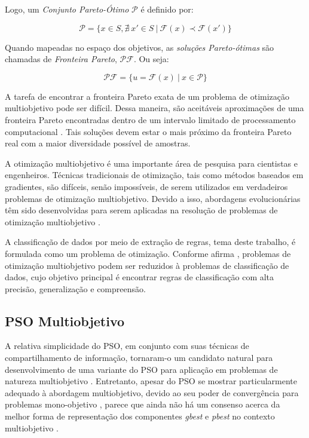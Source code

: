 \documentclass[
	12pt,				%
	openany,			%
	oneside,	
	a4paper,			%
	brazil,				%
	]{unimontes-ppgmsc-abntex2}
\begin{document}
Logo, um {\em Conjunto Pareto-Ótimo} $\mathcal{P}$ é definido por:

\begin{equation}
\label{eq:conj_pareto}
\mathcal{P} = \{x \in S, \nexists\ x' \in S\ |\ \mathcal{F}(x) \prec \mathcal{F}(x')\}
\end{equation}

Quando mapeadas no espaço dos objetivos, as {\em soluções Pareto-ótimas} são chamadas de {\em Fronteira Pareto}, $\mathcal{PF}$. Ou seja:

\begin{equation}
\label{eq:front_pareto}
\mathcal{PF} = \{ u = \mathcal{F}(x)\ |\ x \in \mathcal{P} \}
\end{equation}

A tarefa de encontrar a fronteira Pareto exata de um problema de otimização multiobjetivo pode ser difícil. Dessa maneira, são aceitáveis aproximações de uma fronteira Pareto encontradas dentro de um intervalo limitado de processamento computacional \cite{Coello_2006}. Tais soluções devem estar o mais próximo da fronteira Pareto real com a maior diversidade possível de amostras. 

A otimização multiobjetivo é uma importante área de pesquisa para cientistas e engenheiros. Técnicas tradicionais de otimização, tais como métodos baseados em gradientes, são difíceis, senão impossíveis, de serem utilizados em verdadeiros problemas de otimização multiobjetivo. Devido a isso, abordagens evolucionárias têm sido desenvolvidas para serem aplicadas na resolução de problemas de otimização multiobjetivo \cite{Hu_2003}. 

A classificação de dados por meio de extração de regras, tema deste trabalho, é formulada como um problema de otimização. Conforme afirma , problemas de otimização multiobjetivo podem ser reduzidos à problemas de classificação de dados, cujo objetivo principal é encontrar regras de classificação com alta precisão, generalização e compreensão. 


\subsection{PSO Multiobjetivo}
\label{sec:pso_mult}

A relativa simplicidade do PSO, em conjunto com suas técnicas de compartilhamento de informação, tornaram-o um candidato natural para desenvolvimento de uma variante do PSO para aplicação em problemas de natureza multiobjetivo \cite{Mishra_2016}. Entretanto, apesar do PSO se mostrar particularmente adequado à abordagem multiobjetivo, devido ao seu poder de convergência para problemas mono-objetivo \cite{Coello_2004}, parece que ainda não há um consenso acerca da melhor forma de representação dos componentes {\em gbest} e {\em pbest} no contexto multiobjetivo \cite{Reddy_2007}. 
\end{document}
